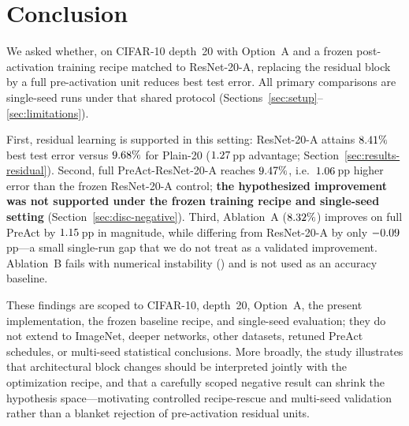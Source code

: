 \section{Conclusion}
\label{sec:conclusion}


We asked whether, on CIFAR-10 depth~20 with Option~A and a frozen post-activation training
recipe matched to ResNet-20-A, replacing the residual block by a full pre-activation unit
reduces best test error.
All primary comparisons are single-seed runs under that shared protocol
(Sections~\ref{sec:setup}--\ref{sec:limitations}).

First, residual learning is supported in this setting:
ResNet-20-A attains $8.41\%$ best test error versus $9.68\%$ for Plain-20
($1.27$\,pp advantage; Section~\ref{sec:results-residual}).
Second, full PreAct-ResNet-20-A reaches $9.47\%$, i.e.\
$1.06$\,pp higher error than the frozen ResNet-20-A control;
\textbf{the hypothesized improvement was not supported under the frozen training recipe and
single-seed setting}
(Section~\ref{sec:disc-negative}).
Third, Ablation~A ($8.32\%$) improves on full PreAct by
$1.15$\,pp in magnitude, while differing from ResNet-20-A by only
$-0.09$\,pp---a small single-run gap that we do not treat as a
validated improvement.
Ablation~B fails with numerical instability (\AblationBStatus) and is not used as an
accuracy baseline.

These findings are scoped to CIFAR-10, depth~20, Option~A, the present implementation, the
frozen baseline recipe, and single-seed evaluation; they do not extend to ImageNet, deeper
networks, other datasets, retuned PreAct schedules, or multi-seed statistical conclusions.
More broadly, the study illustrates that architectural block changes should be interpreted
jointly with the optimization recipe, and that a carefully scoped negative result can shrink
the hypothesis space---motivating controlled recipe-rescue and multi-seed validation rather
than a blanket rejection of pre-activation residual units.
